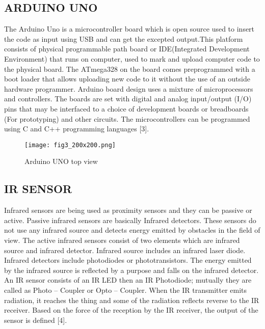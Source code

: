 \documentclass[conference]{IEEEtran}
\begin{document}
    \subsection{ARDUINO UNO}\label{AA}
    The Arduino Uno is a microcontroller board which is open
    source used to insert the code as input using USB and can get
    the excepted output.This platform consists of physical
    programmable path board or IDE(Integrated Development
    Environment) that runs on computer, used to mark and
    upload computer code to the physical board. The
    ATmega328 on the board comes preprogrammed with a
    boot loader that allows uploading new code to it without the
    use of an outside hardware programmer. Arduino board
    design uses a mixture of microprocessors and controllers.
    The
    boards
    are
    set
    with
    digital
    and
    analog input/output (I/O) pins that may be interfaced to a
    choice of development boards or breadboards (For
    prototyping) and other circuits. The microcontrollers can be
    programmed using C and C++ programming languages [3].

    \begin{figure}[htbp]
        \centerline{\texttt{[image: fig3\_200x200.png]}}
        \caption{Arduino UNO top view}
        \label{fig}
    \end{figure}

    \subsection{IR SENSOR}
    Infrared sensors are being used as proximity sensors and
    they can be passive or active. Passive infrared sensors are
    basically Infrared detectors. These sensors do not use any
    infrared source and detects energy emitted by obstacles in
    the field of view. The active infrared sensors consist of two
    elements which are infrared source and infrared detector.
    Infrared source includes an infrared laser diode. Infrared
    detectors include photodiodes or phototransistors. The
    energy emitted by the infrared source is reflected by a
    purpose and falls on the infrared detector. An IR sensor
    consists of an IR LED then an IR Photodiode; mutually they
    are called as Photo – Coupler or Opto – Coupler. When the IR
    transmitter emits radiation, it reaches the thing and some of
    the radiation reflects reverse to the IR receiver. Based on the
    force of the reception by the IR receiver, the output of the
    sensor is defined [4].
\end{document}
